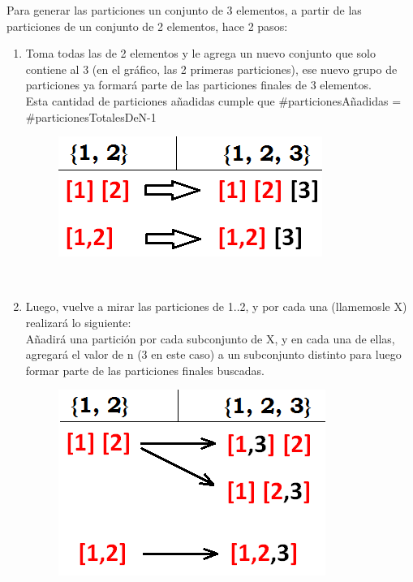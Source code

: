 \documentclass[10pt,a4paper]{article}
\begin{document}
\newpage
Para generar las particiones un conjunto de 3 elementos, a partir de las particiones de un conjunto de 2 elementos, hace 2 pasos:\\
\begin{enumerate}
\item Toma todas las de 2 elementos y le agrega un nuevo conjunto que solo contiene al 3 (en el gráfico, las 2 primeras particiones), ese nuevo grupo de particiones ya formará parte de las particiones finales de 3 elementos.\\
Esta cantidad de particiones añadidas cumple que \#particionesAñadidas = \#particionesTotalesDeN-1
\begin{figure}[h]
	\begin{center}
	   \includegraphics[scale=0.6]{explicacionPaso1.png}
	\end{center}
\end{figure}\\


\item Luego, vuelve a mirar las particiones de 1..2, y por cada una (llamemosle X) realizará lo siguiente:\\
\indent Añadirá una partición por cada subconjunto de X, y en cada una de ellas, agregará el valor de n (3 en este caso) a un subconjunto distinto para luego formar parte de las particiones finales buscadas.\\
\begin{figure}[h]
	\begin{center}
	   \includegraphics[scale=0.6]{explicacionPaso2.png}
	\end{center}
\end{figure}\\


\end{enumerate}
\end{document}
